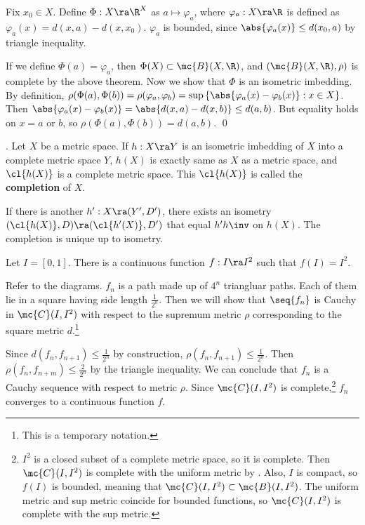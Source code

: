 \pf Fix \(x_0 \in X\). Define \(\Phi: X \ra \R^X\) as \(a \mapsto \varphi_a\), where \(\varphi_a : X \ra \R\) is defined as \(\varphi_a(x) = d(x, a) - d(x, x_0)\). \(\varphi_a\) is bounded, since \(\abs{\varphi_a(x)} \leq d(x_0, a)\) by triangle inequality.

If we define \(\Phi(a) = \varphi_a\), then \(\Phi(X) \subset \mc{B}(X, \R)\), and \((\mc{B}(X, \R), \rho)\) is complete by the above theorem. Now we show that \(\Phi\) is an isometric imbedding. By definition, \(\rho(\Phi(a), \Phi(b)) = \rho(\varphi_a, \varphi_b) = \sup\left\{ \abs{\varphi_a(x) - \varphi_b(x)} : x \in X\right\}\). Then \(\abs{\varphi_a(x) - \varphi_b(x)} = \abs{d(x, a) - d(x, b)} \leq d(a, b)\). But equality holds on \(x = a\) or \(b\), so \(\rho(\Phi(a), \Phi(b)) = d(a, b)\). \qed

. Let \(X\) be a metric space. If \(h : X \ra Y\) is an isometric imbedding of \(X\) into a complete metric space \(Y\), \(h(X)\) is exactly same as \(X\) as a metric space, and \(\cl{h(X)}\) is a complete metric space. This \(\cl{h(X)}\) is called the \textbf{completion} of \(X\).

If there is another \(h' : X \ra (Y', D')\), there exists an isometry \((\cl{h(X)}, D) \ra (\cl{h'(X)}, D')\) that equal \(h'h\inv\) on \(h(X)\). The completion is unique up to isometry.


 Let \(I = [0, 1]\). There is a continuous function \(f : I \ra I^2\) such that \(f(I) = I^2\).

\pf Refer to the diagrams. \(f_n\) is a path made up of \(4^n\) triangluar paths. Each of them lie in a square having side length \(\frac{1}{2^n}\). Then we will show that \(\seq{f_n}\) is Cauchy in \(\mc{C}(I, I^2)\) with respect to the supremum metric \(\rho\) corresponding to the square metric \(d\).\footnote{This is a temporary notation.}

Since \(d(f_n, f_{n+1}) \leq \frac{1}{2^n}\) by construction, \(\rho(f_n, f_{n+1}) \leq \frac{1}{2^n}\). Then \(\rho(f_n, f_{n+m}) \leq \frac{2}{2^n}\) by the triangle inequality. We can conclude that \(f_n\) is a Cauchy sequence with respect to metric \(\rho\). Since \(\mc{C}(I, I^2)\) is complete,\footnote{\(I^2\) is a closed subset of a complete metric space, so it is complete. Then \(\mc{C}(I, I^2)\) is complete with the uniform metric by . Also, \(I\) is compact, so \(f(I)\) is bounded, meaning that \(\mc{C}(I, I^2) \subset \mc{B}(I, I^2)\). The uniform metric and sup metric coincide for bounded functions, so \(\mc{C}(I, I^2)\) is complete with the sup metric.} \(f_n\) converges to a continuous function \(f\).

